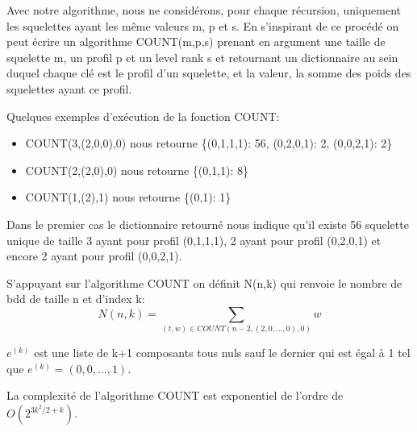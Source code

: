 \documentclass[french]{article}
\begin{document}
Avec notre algorithme, nous ne considérons, pour chaque récursion, uniquement les squelettes ayant les même valeurs m, p et s. 
En s'inspirant de ce procédé on peut écrire un algorithme COUNT(m,p,s) prenant en argument une taille de squelette m, un profil p et un level rank s et retournant un dictionnaire au sein duquel chaque clé est le profil d'un squelette, et la valeur, la somme des poids des squelettes ayant ce profil. 

Quelques exemples d'exécution de la fonction COUNT:
\begin{itemize}
    \item COUNT(3,(2,0,0),0) nous retourne \{(0,1,1,1): 56, (0,2,0,1): 2, (0,0,2,1): 2\}
    \item COUNT(2,(2,0),0) nous retourne  \{(0,1,1): 8\}
    \item COUNT(1,(2),1) nous retourne \{(0,1): 1\}
\end{itemize}

Dans le premier cas le dictionnaire retourné nous indique qu'il existe 56 squelette unique de taille 3 ayant pour profil (0,1,1,1), 2 ayant pour profil (0,2,0,1) et encore 2 ayant pour profil (0,0,2,1).

\vspace{5mm} 

S'appuyant sur l'algorithme COUNT on définit N(n,k) qui renvoie le nombre de bdd de taille n et d'index k:
\[N(n,k)=\underset{(t,w)\in COUNT(n-2,(2,0,...,0),0)}{\sum} w\]

\(e^{(k)}\) est une liste de k+1 composants tous nuls sauf le dernier qui est égal à 1 tel que \(e^{(k)} = (0,0,...,1)\).

La complexité de l'algorithme COUNT est exponentiel de l'ordre de \(O(2^{3k^2/2+k})\).
\end{document}
